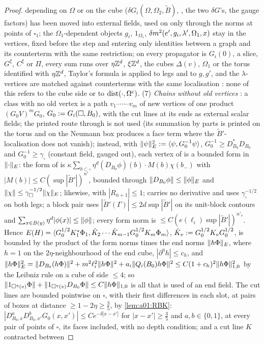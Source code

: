 \begin{proof}
depending on $\Omega$ or on the cube ($\delta G_i(\Omega,\Omega_2,\tilde B)$, \cite[(1.16)]{Ba3}, the two $\delta G$'s, the gauge factors) has been moved into external fields, used on \cite[pp.~434--445]{Ba3} only through the norms \cite[(3.3)]{Ba3} at points of $\square_1$; the $\Omega_1$-dependent objects $g_i$, $1_{\Omega_1}$, $\delta m^2(e',g_i,\lambda',\Omega_1,x)$ stay in the vertices, fixed before the step and entering only identities between a graph and its counterterm with the same restriction; on \cite[pp.~434--445]{Ba3} every propagator is $G_i(0)$, a slice, $G^\xi$, $C^\xi$ or $\Pi$, every sum runs over $\eta\mathbb Z^d$, $\xi\mathbb Z^d$, the cubes $\Delta(v)$, $\Omega_1$ or the torus identified with $\eta\mathbb Z^d$, Taylor's formula \cite[(3.10)]{Ba3} is applied to legs and to $g,g'$, and the $\lambda$-vertices are matched against counterterms with the same localisation \cite[(3.19), pp.~444--445]{Ba3}: none of this refers to the cube side or to $\operatorname{dist}(\cdot,\Omega^c)$. (7) \emph{Chains without old vertices} \cite[p.~433]{Ba3}: a class with no old vertex is a path $v_1$--$\cdots$--$v_m$ of new vertices of one product $(G_0V)^mG_0$, $G_0:= G_i(\square,B_0)$, with the cut lines at its ends as external scalar fields; the printed route through \cite[Prop.~2.1]{Ba3} is not used (its summation by parts \cite[(2.8)]{Ba3} is printed on the torus and on the Neumann box produces a face term where the $\tilde B'$-localisation does not vanish); instead, with $\lVert \psi\rVert_E^2:=\langle \psi,G_0^{-1}\psi\rangle$, $G_0^{-1}\ge D_{B_0}^*D_{B_0}$ and $G_0^{-1}\ge\gamma_\square$ (constant field, gauged out), each vertex of \cite[(1.8)--(1.11), (1.13)--(1.15)]{Ba3} is a bounded form in $\lVert \cdot\rVert_E$: the form of \cite[(1.8)]{Ba3} is $\kappa\sum_{b\subset\square}\eta^d(D_{B_0}\phi)(b)\cdot M(b)\chi(b_-)$ with $|M(b)|\le C(\sup|\tilde B'|)^{n'}$, bounded through $\lVert D_{B_0}\phi\rVert\le\lVert \phi\rVert_E$ and $\lVert \chi\rVert\le\gamma_\square^{-1/2}\lVert \chi\rVert_E$; \cite[(1.9), (1.11)]{Ba3} likewise, with $|R_{\bar n+1}|\le1$; \cite[(1.10)]{Ba3} carries no derivative and uses $\gamma_\square^{-1/2}$ on both legs; a block pair \cite[(1.13)--(1.14)]{Ba3} uses $|\tilde B'(\Gamma)|\le2d\sup|\tilde B'|$ on its unit-block contours and $\sum_{x\in B(y)}\eta^d|\phi(x)|\le\lVert \phi\rVert$; every form norm is $\le C(e(\ell_i)\sup|\tilde B'|)^{n'_v}$. Hence $E(H)=\langle G_0^{1/2}K_1^*\Phi_1,\hat K_2\cdots\hat K_{m-1}G_0^{1/2}K_m\Phi_m\rangle$, $\hat K_v:= G_0^{1/2}K_vG_0^{1/2}$, is bounded by the product of the form norms times the end norms $\lVert h\Phi\rVert_E$, where $h=1$ on the $2\eta$-neighbourhood of the end cube, $|\partial^\eta h|\le c_h$, and $\lVert h\Phi\rVert_E^2=\lVert D_{B_0}(h\Phi)\rVert^2+m^2\ell_i^2\lVert h\Phi\rVert^2+a_i\lVert Q_i(B_0)h\Phi\rVert^2\le C(1+c_h)^2\lVert h\Phi\rVert_{1,0}^2$ by the Leibniz rule on a cube of side $\le4$; so $\lVert 1_{\square^\eta(v)}\Phi\rVert+\lVert 1_{\square^\eta(v)}D_{B_0}\Phi\rVert\le C\lVert h\Phi\rVert_{1,0}$ is all that is used of an end field. The cut lines are bounded pointwise on $\square$, with their first differences in each slot, at pairs of boxes at distance $\ge1-2\eta\ge\frac35$, by \cref{lem:a01:RBK}: $|D^a_{B_0,x}D^b_{B_0,x'}G_0(x,x')|\le Ce^{-\delta|x-x'|}$ for $|x-x'|\ge\frac35$ and $a,b\in\{0,1\}$, at every pair of points of $\square$, its faces included, with no depth condition; and a cut line $K$ contracted between 
\end{proof}
